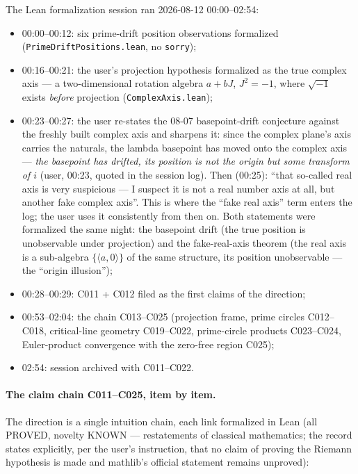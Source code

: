 \documentclass[sigplan,10pt,anonymous,review]{acmart}
\begin{document}
The Lean formalization session ran 2026-08-12 00:00--02:54:
\begin{itemize}
\item 00:00--00:12: six prime-drift position observations formalized
  (\texttt{PrimeDriftPositions.lean}, no \texttt{sorry});
\item 00:16--00:21: the user's projection hypothesis formalized as the true
  complex axis --- a two-dimensional rotation algebra $a+bJ$, $J^2=-1$, where
  $\sqrt{-1}$ exists \emph{before} projection (\texttt{ComplexAxis.lean});
\item 00:23--00:27: the user re-states the 08-07 basepoint-drift
  conjecture against the freshly built complex axis and sharpens it: since
  the complex plane's axis carries the naturals, the lambda basepoint has
  moved onto the complex axis --- \emph{the basepoint has drifted, its
  position is not the origin but some transform of $i$} (user, 00:23,
  quoted in the session log). Then (00:25): ``that so-called real axis is
  very suspicious --- I suspect it is not a real number axis at all, but
  another fake complex axis''. This is where the ``fake real axis'' term
  enters the log; the user uses it consistently from then on. Both
  statements were formalized the same night: the basepoint drift (the true
  position is unobservable under projection) and the fake-real-axis theorem
  (the real axis is a sub-algebra $\{\langle a,0\rangle\}$ of the same
  structure, its position unobservable --- the ``origin illusion'');
\item 00:28--00:29: C011 + C012 filed as the first claims of the direction;
\item 00:53--02:04: the chain C013--C025 (projection frame, prime circles
  C012--C018, critical-line geometry C019--C022, prime-circle products
  C023--C024, Euler-product convergence with the zero-free region C025);
\item 02:54: session archived with C011--C022.
\end{itemize}

\paragraph{The claim chain C011--C025, item by item.} The direction is a
single intuition chain, each link formalized in Lean (all PROVED, novelty
KNOWN --- restatements of classical mathematics; the record states
explicitly, per the user's instruction, that no claim of proving the
Riemann hypothesis is made and mathlib's official statement remains
unproved):
\end{document}
